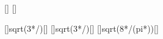 [\kilogram\per\meter\cubed]
[\kilogram\per\meter\cubed]

[]{sqrt(3*\ncpoX/\rEgX)}[\mps]
[]{sqrt(3*\ncpoX/\rMeX)}[\mps]
[]{sqrt(8*\ncpoX/(pi*\rEgX))}[\mps]
